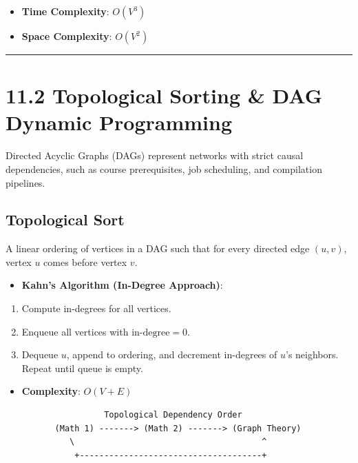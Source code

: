 \documentclass[
]{book}
\providecommand{\tightlist}{%
  \setlength{\itemsep}{0pt}\setlength{\parskip}{0pt}}
\theoremstyle{definition}
\theoremstyle{definition}
\theoremstyle{definition}
\theoremstyle{definition}
\theoremstyle{remark}
\begin{document}
\begin{itemize}
\tightlist
\item
  \textbf{Time Complexity}: \(O(V^3)\)
\item
  \textbf{Space Complexity}: \(O(V^2)\)
\end{itemize}

\begin{center}\rule{0.5\linewidth}{0.5pt}\end{center}

\section{11.2 Topological Sorting \& DAG Dynamic Programming}\label{topological-sorting-dag-dynamic-programming}

Directed Acyclic Graphs (DAGs) represent networks with strict causal dependencies, such as course prerequisites, job scheduling, and compilation pipelines.

\subsection{Topological Sort}\label{topological-sort}

A linear ordering of vertices in a DAG such that for every directed edge \((u, v)\), vertex \(u\) comes before vertex \(v\).

\begin{itemize}
\tightlist
\item
  \textbf{Kahn's Algorithm (In-Degree Approach)}:
\end{itemize}

\begin{enumerate}
\def\labelenumi{\arabic{enumi}.}
\tightlist
\item
  Compute in-degrees for all vertices.
\item
  Enqueue all vertices with \(\text{in-degree} = 0\).
\item
  Dequeue \(u\), append to ordering, and decrement in-degrees of \(u\)'s neighbors. Repeat until queue is empty.
\end{enumerate}

\begin{itemize}
\tightlist
\item
  \textbf{Complexity}: \(O(V + E)\)
\end{itemize}

\begin{verbatim}
                    Topological Dependency Order
          (Math 1) -------> (Math 2) -------> (Graph Theory)
             \                                      ^
              +-------------------------------------+
\end{verbatim}
\end{document}
